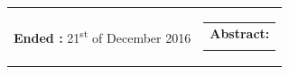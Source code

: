 \begin{titlepage}
\begin{nopagebreak}
{\begin{tabular}{cc}
{\begin{description}
						\item {\bf Ended :} 
							21\textsuperscript{st} of December 2016
					\end{description}
				} &
				\parbox[t]{.45\textwidth}{
					\vspace{.15cm}
					\hfill 
					\begin{tabular}[t]{l}
						{\bf Abstract:}\bigskip \\
						\fbox{
							\parbox{.35\textwidth}{\smallskip
								{\vfill{\small 
								\smallskip}}
							}
						}
					\end{tabular}
				}
			\end{tabular}
		}
	\end{nopagebreak}
\end{titlepage}
